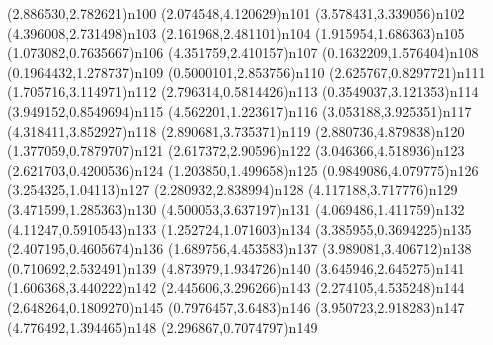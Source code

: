 \dotnode[](2.886530,2.782621){n100}
\dotnode[](2.074548,4.120629){n101}
\dotnode[](3.578431,3.339056){n102}
\dotnode[](4.396008,2.731498){n103}
\dotnode[](2.161968,2.481101){n104}
\dotnode[](1.915954,1.686363){n105}
\dotnode[](1.073082,0.7635667){n106}
\dotnode[](4.351759,2.410157){n107}
\dotnode[](0.1632209,1.576404){n108}
\dotnode[](0.1964432,1.278737){n109}
\dotnode[](0.5000101,2.853756){n110}
\dotnode[](2.625767,0.8297721){n111}
\dotnode[](1.705716,3.114971){n112}
\dotnode[](2.796314,0.5814426){n113}
\dotnode[](0.3549037,3.121353){n114}
\dotnode[](3.949152,0.8549694){n115}
\dotnode[](4.562201,1.223617){n116}
\dotnode[](3.053188,3.925351){n117}
\dotnode[](4.318411,3.852927){n118}
\dotnode[](2.890681,3.735371){n119}
\dotnode[](2.880736,4.879838){n120}
\dotnode[](1.377059,0.7879707){n121}
\dotnode[](2.617372,2.90596){n122}
\dotnode[](3.046366,4.518936){n123}
\dotnode[](2.621703,0.4200536){n124}
\dotnode[](1.203850,1.499658){n125}
\dotnode[](0.9849086,4.079775){n126}
\dotnode[](3.254325,1.04113){n127}
\dotnode[](2.280932,2.838994){n128}
\dotnode[](4.117188,3.717776){n129}
\dotnode[](3.471599,1.285363){n130}
\dotnode[](4.500053,3.637197){n131}
\dotnode[](4.069486,1.411759){n132}
\dotnode[](4.11247,0.5910543){n133}
\dotnode[](1.252724,1.071603){n134}
\dotnode[](3.385955,0.3694225){n135}
\dotnode[](2.407195,0.4605674){n136}
\dotnode[](1.689756,4.453583){n137}
\dotnode[](3.989081,3.406712){n138}
\dotnode[](0.710692,2.532491){n139}
\dotnode[](4.873979,1.934726){n140}
\dotnode[](3.645946,2.645275){n141}
\dotnode[](1.606368,3.440222){n142}
\dotnode[](2.445606,3.296266){n143}
\dotnode[](2.274105,4.535248){n144}
\dotnode[](2.648264,0.1809270){n145}
\dotnode[](0.7976457,3.6483){n146}
\dotnode[](3.950723,2.918283){n147}
\dotnode[](4.776492,1.394465){n148}
\dotnode[](2.296867,0.7074797){n149}

